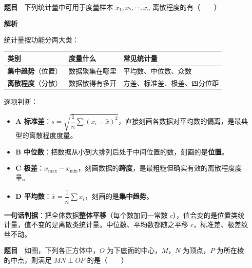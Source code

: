 \par\medskip



\textbf{题目}　下列统计量中可用于度量样本 $x_1,x_2,\cdots,x_n$ 离散程度的有（　　）

\textbf{解析}

统计量按功能分两大类：

\begin{center}
\begin{tabular}{lll}
\toprule
类别 & 度量什么 & 常见统计量 \\
\midrule
\textbf{集中趋势}（位置） & 数据聚集在哪里 & 平均数、中位数、众数 \\
\textbf{离散程度}（分散） & 数据散得有多开 & 方差、标准差、极差、四分位距 \\
\bottomrule
\end{tabular}
\end{center}

逐项判断：

\begin{itemize}
\item \textbf{A  标准差}：$s=\sqrt{\dfrac1n\sum\left(x_i-\bar x\right)^{2}}$，直接刻画各数据对平均数的偏离，是最典型的离散程度度量。
\item \textbf{B  中位数}：把数据从小到大排列后处于中间位置的数，刻画的是\textbf{位置}。
\item \textbf{C  极差}：$x_{\max}-x_{\min}$，刻画数据的\textbf{跨度}，是最粗糙但确实有效的离散程度度量。
\item \textbf{D  平均数}：$\bar x=\dfrac1n\sum x_i$，刻画的是\textbf{集中趋势}。
\end{itemize}


\begin{gktip}
\textbf{一句话判据}：把全体数据\textbf{整体平移}（每个数加同一常数 $c$），值会变的是位置类统计量，值不变的是离散类统计量。中位数、平均数都随之平移 $c$，标准差、极差纹丝不动。
\end{gktip}

\par\medskip


\textbf{题目}　如图，下列各正方体中，$O$ 为下底面的中心，$M$，$N$ 为顶点，$P$ 为所在棱的中点，则满足 $MN\perp OP$ 的是（　　）

\begin{center}\end{center}


